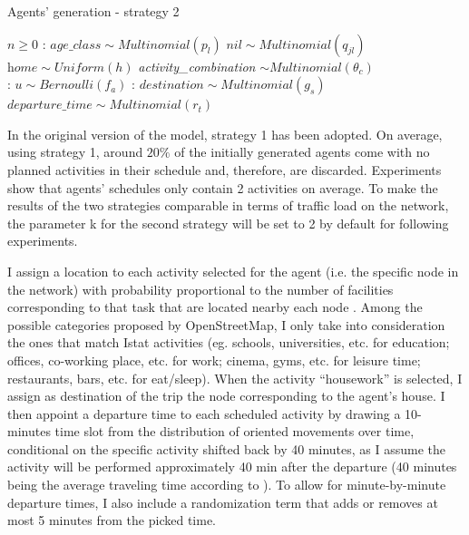 \begin{algorithm}[H]
\caption{Agents' generation - strategy 2}\label{alg2}
\begin{algorithmic}
\Require $n \geq 0$
:
\State $\textit{age\_class} \sim Multinomial(p_l)$ 
\State $\textit{nil} \sim Multinomial(q_{jl})$ 
\State $\textit{home} \sim Uniform(h)$ 
\State \textit{activity\_combination} $\sim Multinomial(\theta_c)$
\\
:
\State $ \textit{u} \sim Bernoulli(f_a)$ 
:
    \State $\textit{destination} \sim Multinomial(g_s)$ \\
    \State $\textit{departure\_time} \sim Multinomial(r_t)$ \\
\EndIf
\EndFor
\EndFor
\end{algorithmic}
\end{algorithm}
In the original version of the model, strategy 1 has been adopted. On average, using strategy 1, around $20\%$ of the initially generated agents come with no planned activities in their schedule and, therefore, are discarded. Experiments show that agents' schedules only contain 2 activities on average. To make the results of the two strategies comparable in terms of traffic load on the network, the parameter k for the second strategy will be set to 2 by default for following experiments. 

I assign a location to each activity selected for the agent (i.e. the specific node in the network) with probability proportional to the number of facilities corresponding to that task that are located nearby each node \cite{site9}. Among the possible categories proposed by OpenStreetMap, I only take into consideration the ones that match Istat activities (eg. schools, universities, etc. for education; offices, co-working place, etc. for work; cinema, gyms, etc. for leisure time; restaurants, bars, etc. for eat/sleep). When the activity “housework” is selected, I assign as destination of the trip the node corresponding to the agent’s house. I then appoint a departure time to each scheduled activity by drawing a 10-minutes time slot from the distribution of oriented movements over time, conditional on the specific activity \cite{site11} shifted back by 40 minutes, as I assume the activity will be performed approximately 40 min after the departure (40 minutes being the average traveling time according to \cite{bib2}). To allow for minute-by-minute departure times, I also include a randomization term that adds or removes at most 5 minutes from the picked time. 


